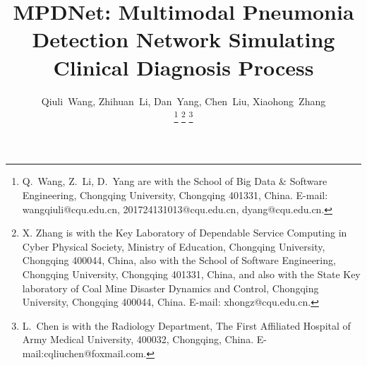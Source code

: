 \documentclass[journal]{IEEEtran}
\begin{document}
%
\title{MPDNet: Multimodal Pneumonia Detection Network Simulating Clinical Diagnosis Process}
%
%
%

\author{Qiuli~Wang,
        Zhihuan~Li,
        Dan~Yang,
        Chen~Liu,
        Xiaohong~Zhang%

\thanks{Q.~Wang, Z.~Li, D.~Yang are with the School of Big Data \& Software Engineering, Chongqing University, Chongqing 401331, China.  E-mail: wangqiuli@cqu.edu.cn, 201724131013@cqu.edu.cn, dyang@cqu.edu.cn.}
\thanks{X. Zhang is with the Key Laboratory of Dependable Service Computing in Cyber Physical Society, Ministry of Education, Chongqing University, Chongqing 400044, China, also with the School of Software Engineering, Chongqing University, Chongqing 401331, China, and also with the State Key laboratory of Coal Mine Disaster Dynamics and Control, Chongqing University, Chongqing 400044, China. E-mail: xhongz@cqu.edu.cn.}
\thanks{L.~Chen is with the Radiology Department, The First Affiliated Hospital of Army Medical University, 400032, Chongqing, China. E-mail:cqliuchen@foxmail.com.}

}

% 
%
\end{document}
